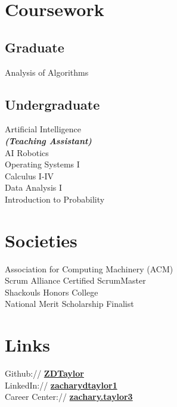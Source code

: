 \documentclass[]{deedy-resume-reversed}
\begin{document}
\begin{minipage}[t]{0.33\textwidth}

\section{Coursework}
\subsection{Graduate}
Analysis of Algorithms
\sectionsep

\subsection{Undergraduate}
Artificial Intelligence \\
{\footnotesize \textit{\textbf{(Teaching Assistant) }}} \\
AI Robotics \\
Operating Systems I \\
Calculus I-IV \\
Data Analysis I \\
Introduction to Probability \\
\sectionsep


\section{Societies}
Association for Computing Machinery (ACM)\\
Scrum Alliance Certified ScrumMaster\\
Shackouls Honors College\\
National Merit Scholarship Finalist \\
\sectionsep


\section{Links}
Github:// \href{https://github.com/ZDTaylor}{\bf ZDTaylor} \\
LinkedIn://  \href{https://www.linkedin.com/in/zacharydtaylor1}{\bf zacharydtaylor1} \\
Career Center:// \href{https://msstate-csm.symplicity.com/profiles/zachary.taylor3}{\bf zachary.taylor3}
\sectionsep

\end{minipage}
\end{document}
